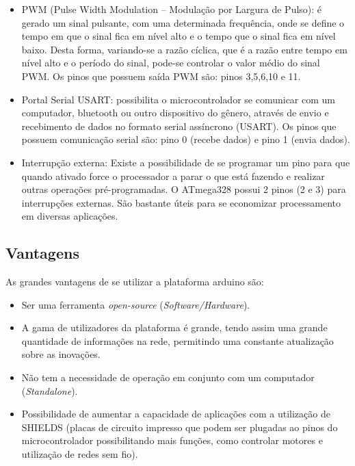 \begin{itemize}
\item PWM (Pulse Width Modulation – Modulação por Largura de Pulso): é gerado um sinal pulsante, com uma determinada frequência, onde se define o tempo em que o sinal fica em nível alto e o tempo que o sinal fica em nível baixo. Desta forma, variando-se a razão cíclica, que é a razão entre tempo em nível alto e o período do sinal,  pode-se controlar o valor médio do sinal PWM. Os pinos que possuem saída PWM são: pinos 3,5,6,10 e 11. 

\item Portal Serial USART:  possibilita o microcontrolador se comunicar com um computador, bluetooth ou outro dispositivo do gênero, através de envio e recebimento de dados no formato serial assíncrono (USART). Os pinos que possuem comunicação serial são: pino 0 (recebe dados) e pino 1 (envia dados).

\item Interrupção externa: Existe a possibilidade de se programar um pino para que quando ativado force o processador a parar o que está fazendo e realizar outras operações pré-programadas. O ATmega328 possui 2 pinos (2 e 3) para interrupções externas. São bastante úteis para se economizar processamento em diversas aplicações.

\end{itemize}

\subsection{Vantagens}

As grandes vantagens de se utilizar a plataforma arduino são:
\begin{itemize}

\item	Ser uma ferramenta \textit{open-source} (\textit{Software/Hardware}).
\item	A gama de utilizadores da plataforma é grande, tendo assim uma grande quantidade de informações na rede, permitindo uma constante atualização sobre as inovações.
\item	Não tem a necessidade de operação em conjunto com um computador (\textit{Standalone}).
\item	Possibilidade de aumentar a capacidade de aplicações com a utilização de SHIELDS (placas de circuito impresso que podem ser plugadas ao pinos do microcontrolador possibilitando mais funções, como controlar motores e utilização de redes sem fio).

\end{itemize}


